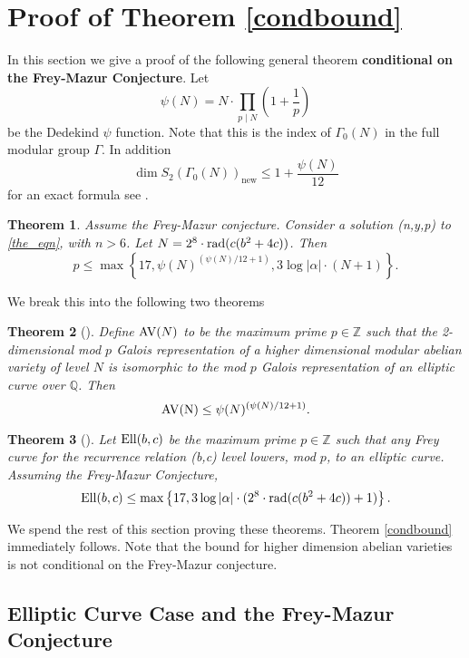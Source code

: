 \documentclass[12pt]{amsart}
\newtheorem{thm}{Theorem}[section]
\theoremstyle{definition}
\def\Q{{\mathbb Q}}
\def\Z{{\mathbb Z}}
\newcommand{\rad}{{\rm{rad}}}
\newcommand{\Ell}{\rm{Ell}}
\newcommand{\AV}{\rm{AV}}
\begin{document}
\section{Proof of Theorem \ref{condbound}}\label{genthmproof}

In this section we give a proof of the following general theorem \textbf{conditional on the Frey-Mazur Conjecture}.  Let 
\[\psi(N) = N \cdot \prod_{p \mid N} \left( 1 + \frac{1}{p} \right) \]
be the Dedekind $\psi$ function.  Note that this is the index of $\Gamma_0(N)$ in the full modular group $\Gamma$. In addition 
\[ \dim S_2(\Gamma_0(N))_{\text{new}} \leq 1 + \frac{\psi(N)}{12} \]
for an exact formula see \cite{stein07}.

\begin{thm}\label{condbound_inplace}
Assume the Frey-Mazur conjecture.  Consider a solution (n,y,p) to \eqref{the_eqn}, with $n > 6$. Let $N = 2^8 \cdot \rad(c(b^2+4c))$. Then 
\[ p \leq \max\left\{17,   \psi(N)^{(\psi(N)/12 + 1)}, 3\log{|\alpha|} \cdot ( N+1)  \right\}. \]
\end{thm}

We break this into the following two theorems

\begin{thm}[]\label{bound_av}
Define ${\AV}(N)$ to be the maximum prime $p \in \Z$ such that the 2-dimensional mod $p$ Galois representation of a higher dimensional modular abelian variety of level $N$ is isomorphic to the mod $p$ Galois representation of an elliptic curve over $\Q$.  Then
\[{\AV(N)} \leq \psi(N)^{(\psi(N)/12+1)}. \]
\end{thm}

\begin{thm}[]\label{bound_ell}
Let ${\Ell}(b,c)$ be the maximum prime $p \in \Z$ such that any Frey curve for the recurrence relation (b,c) level lowers, mod $p$, to an elliptic curve.  Assuming the Frey-Mazur Conjecture, 
\[{\Ell}(b,c) \leq \max\left\{17, 3\log{|\alpha|} \cdot (2^{8} \cdot \rad(c(b^2+4c))+1) \right\}. \]
\end{thm}


We spend the rest of this section proving these theorems. Theorem \ref{condbound} immediately follows.  Note that the bound for higher dimension abelian varieties is not conditional on the Frey-Mazur conjecture.



\subsection{Elliptic Curve Case and the Frey-Mazur Conjecture}
\end{document}
